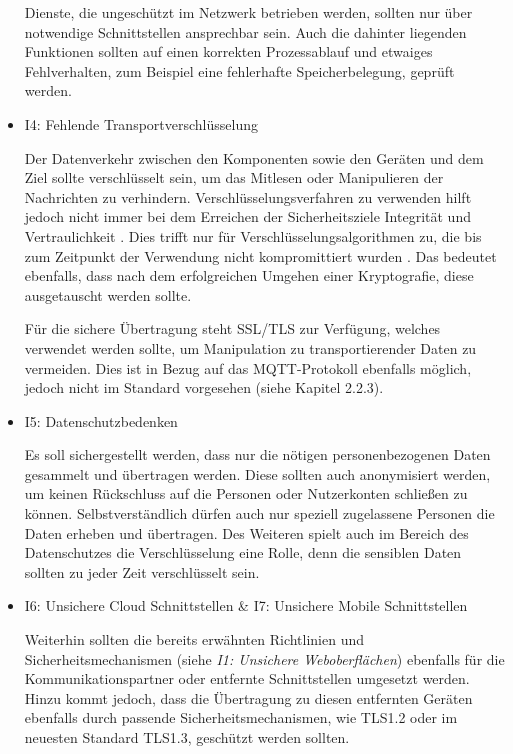 \begin{itemize}
            Dienste, die ungeschützt im Netzwerk betrieben werden, sollten nur über notwendige Schnittstellen ansprechbar sein.
            Auch die dahinter liegenden Funktionen sollten auf einen korrekten Prozessablauf und etwaiges Fehlverhalten, zum Beispiel eine fehlerhafte Speicherbelegung, geprüft werden.
            
            \item I4: Fehlende Transportverschlüsselung
            
            Der Datenverkehr zwischen den Komponenten sowie den Geräten und dem Ziel sollte verschlüsselt sein, um das Mitlesen oder Manipulieren der Nachrichten zu verhindern.
            Verschlüsselungsverfahren zu verwenden hilft jedoch nicht immer bei dem Erreichen der Sicherheitsziele Integrität und Vertraulichkeit \cite{Bedner2010}. Dies trifft nur für Verschlüsselungsalgorithmen zu, die bis zum Zeitpunkt der Verwendung nicht kompromittiert wurden \cite{bsi_2019}. Das bedeutet ebenfalls, dass nach dem erfolgreichen Umgehen einer Kryptografie, diese ausgetauscht werden sollte.
            
            Für die sichere Übertragung steht SSL/TLS zur Verfügung, welches verwendet werden sollte, um Manipulation zu transportierender Daten zu vermeiden. Dies ist in Bezug auf das \ac{MQTT}-Protokoll ebenfalls möglich, jedoch nicht im Standard vorgesehen (siehe Kapitel 2.2.3).
            
            \item I5: Datenschutzbedenken
            
            Es soll sichergestellt werden, dass nur die nötigen personenbezogenen Daten gesammelt und übertragen werden. Diese sollten auch anonymisiert werden, um keinen Rückschluss auf die Personen oder Nutzerkonten schließen zu können.
            Selbstverständlich dürfen auch nur speziell zugelassene Personen die Daten erheben und übertragen.
            Des Weiteren spielt auch im Bereich des Datenschutzes die Verschlüsselung eine Rolle, denn die sensiblen Daten sollten zu jeder Zeit verschlüsselt sein.
    
            \item I6: Unsichere Cloud Schnittstellen \& I7: Unsichere Mobile Schnittstellen
            
            Weiterhin sollten die bereits erwähnten Richtlinien und Sicherheitsmechanismen (siehe \emph{I1: Unsichere Weboberflächen}) ebenfalls für die Kommunikationspartner oder entfernte Schnittstellen umgesetzt werden. Hinzu kommt jedoch, dass die Übertragung zu diesen entfernten Geräten ebenfalls durch passende Sicherheitsmechanismen, wie TLS1.2 oder im neuesten Standard TLS1.3, geschützt werden sollten.
            

\end{itemize}
